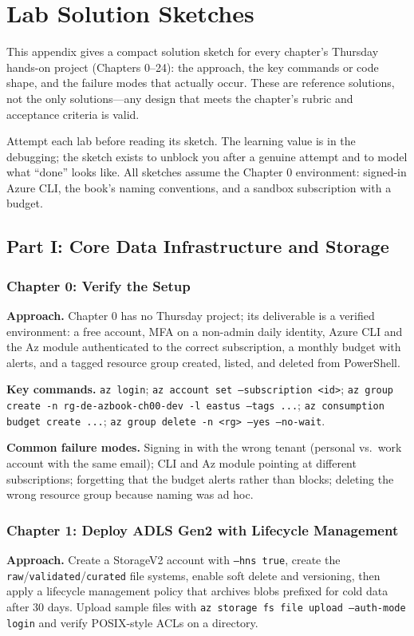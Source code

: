 \chapter{Lab Solution Sketches}
%
This appendix gives a compact solution sketch for every chapter's Thursday hands-on project
(Chapters 0--24): the approach, the key commands or code shape, and the failure modes that
actually occur. These are reference solutions, not the only solutions---any design that meets the
chapter's rubric and acceptance criteria is valid.

\begin{notebox}
Attempt each lab before reading its sketch. The learning value is in the debugging; the sketch
exists to unblock you after a genuine attempt and to model what ``done'' looks like. All sketches
assume the Chapter 0 environment: signed-in Azure CLI, the book's naming conventions, and a
sandbox subscription with a budget.
\end{notebox}

\section{Part I: Core Data Infrastructure and Storage}

\subsection*{Chapter 0: Verify the Setup}
\textbf{Approach.} Chapter 0 has no Thursday project; its deliverable is a verified environment:
a free account, MFA on a non-admin daily identity, Azure CLI and the Az module authenticated to
the correct subscription, a monthly budget with alerts, and a tagged resource group created,
listed, and deleted from PowerShell.

\textbf{Key commands.} \texttt{az login}; \texttt{az account set --subscription <id>};
\texttt{az group create -n rg-de-azbook-ch00-dev -l eastus --tags ...};
\texttt{az consumption budget create ...}; \texttt{az group delete -n <rg> --yes --no-wait}.

\textbf{Common failure modes.} Signing in with the wrong tenant (personal vs.\ work account with
the same email); CLI and Az module pointing at different subscriptions; forgetting that the
budget alerts rather than blocks; deleting the wrong resource group because naming was ad hoc.

\subsection*{Chapter 1: Deploy ADLS Gen2 with Lifecycle Management}
\textbf{Approach.} Create a StorageV2 account with \texttt{--hns true}, create the
\texttt{raw}/\texttt{validated}/\texttt{curated} file systems, enable soft delete and versioning,
then apply a lifecycle management policy that archives blobs prefixed for cold data after 30
days. Upload sample files with \texttt{az storage fs file upload --auth-mode login} and verify
POSIX-style ACLs on a directory.

